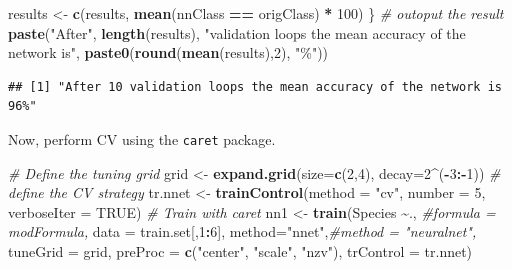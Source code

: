 \documentclass[
]{article}
\newenvironment{Shaded}{\begin{snugshade}}{\end{snugshade}}
\newcommand{\AttributeTok}[1]{\textcolor[rgb]{0.13,0.29,0.53}{#1}}
\newcommand{\CommentTok}[1]{\textcolor[rgb]{0.56,0.35,0.01}{\textit{#1}}}
\newcommand{\ConstantTok}[1]{\textcolor[rgb]{0.56,0.35,0.01}{#1}}
\newcommand{\DecValTok}[1]{\textcolor[rgb]{0.00,0.00,0.81}{#1}}
\newcommand{\FunctionTok}[1]{\textcolor[rgb]{0.13,0.29,0.53}{\textbf{#1}}}
\newcommand{\NormalTok}[1]{#1}
\newcommand{\OtherTok}[1]{\textcolor[rgb]{0.56,0.35,0.01}{#1}}
\newcommand{\SpecialCharTok}[1]{\textcolor[rgb]{0.81,0.36,0.00}{\textbf{#1}}}
\newcommand{\StringTok}[1]{\textcolor[rgb]{0.31,0.60,0.02}{#1}}
\begin{document}
\begin{Shaded}
\begin{Highlighting}[]
\NormalTok{  results }\OtherTok{\textless{}{-}} \FunctionTok{c}\NormalTok{(results, }\FunctionTok{mean}\NormalTok{(nnClass }\SpecialCharTok{==}\NormalTok{ origClass) }\SpecialCharTok{*} \DecValTok{100}\NormalTok{)}
\NormalTok{\} }
\CommentTok{\# outoput the result}
\FunctionTok{paste}\NormalTok{(}\StringTok{"After"}\NormalTok{, }\FunctionTok{length}\NormalTok{(results), }
      \StringTok{"validation loops the mean accuracy of the network is"}\NormalTok{, }
      \FunctionTok{paste0}\NormalTok{(}\FunctionTok{round}\NormalTok{(}\FunctionTok{mean}\NormalTok{(results),}\DecValTok{2}\NormalTok{), }\StringTok{"\%"}\NormalTok{))}
\end{Highlighting}
\end{Shaded}

\begin{verbatim}
## [1] "After 10 validation loops the mean accuracy of the network is 96%"
\end{verbatim}

Now, perform CV using the \texttt{caret} package.

\begin{Shaded}
\begin{Highlighting}[]
\CommentTok{\# Define the tuning grid}
\NormalTok{grid }\OtherTok{\textless{}{-}}  \FunctionTok{expand.grid}\NormalTok{(}\AttributeTok{size=}\FunctionTok{c}\NormalTok{(}\DecValTok{2}\NormalTok{,}\DecValTok{4}\NormalTok{), }\AttributeTok{decay=}\DecValTok{2}\SpecialCharTok{\^{}}\NormalTok{(}\SpecialCharTok{{-}}\DecValTok{3}\SpecialCharTok{:{-}}\DecValTok{1}\NormalTok{))}
\CommentTok{\# define the CV strategy}
\NormalTok{tr.nnet }\OtherTok{\textless{}{-}} \FunctionTok{trainControl}\NormalTok{(}\AttributeTok{method =} \StringTok{"cv"}\NormalTok{,}
                        \AttributeTok{number =} \DecValTok{5}\NormalTok{,}
                        \AttributeTok{verboseIter =} \ConstantTok{TRUE}\NormalTok{)}
\CommentTok{\# Train with \textasciigrave{}caret\textasciigrave{} }
\NormalTok{nn1 }\OtherTok{\textless{}{-}} \FunctionTok{train}\NormalTok{(Species }\SpecialCharTok{\textasciitilde{}}\NormalTok{., }\CommentTok{\#formula = modFormula, }
            \AttributeTok{data =}\NormalTok{ train.set[,}\DecValTok{1}\SpecialCharTok{:}\DecValTok{6}\NormalTok{], }
            \AttributeTok{method=}\StringTok{"nnet"}\NormalTok{,}\CommentTok{\#method = "neuralnet", }
            \AttributeTok{tuneGrid =}\NormalTok{ grid,}
            \AttributeTok{preProc =} \FunctionTok{c}\NormalTok{(}\StringTok{"center"}\NormalTok{, }\StringTok{"scale"}\NormalTok{, }\StringTok{"nzv"}\NormalTok{), }
            \AttributeTok{trControl =}\NormalTok{ tr.nnet)}
\end{Highlighting}
\end{Shaded}
\end{document}
